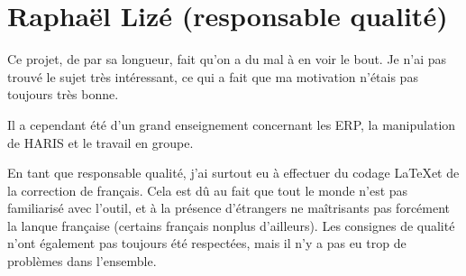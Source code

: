 \section{Raphaël Lizé (responsable qualité)}

Ce projet, de par sa longueur, fait qu'on a du mal à en voir
le bout. Je n'ai pas trouvé le sujet très intéressant, ce qui
a fait que ma motivation n'étais pas toujours très bonne.

Il a cependant été d'un grand enseignement concernant les ERP,
la manipulation de HARIS et le travail en groupe.

En tant que responsable qualité, j'ai surtout eu à effectuer
du codage \LaTeX et de la correction de français. Cela est dû
au fait que tout le monde n'est pas familiarisé avec l'outil,
et à la présence d'étrangers ne maîtrisants pas forcément
la lanque française (certains français nonplus d'ailleurs).
Les consignes de qualité n'ont également pas toujours été respectées,
mais il n'y a pas eu trop de problèmes dans l'ensemble.
